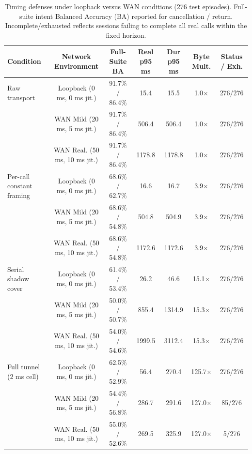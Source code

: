 \begin{table}[t]
\centering
\caption{Timing defenses under loopback versus WAN conditions (276 test episodes). Full-suite intent Balanced Accuracy (BA) reported for cancellation / return. Incomplete/exhausted reflects sessions failing to complete all real calls within the fixed horizon.}
\label{tab:wan-controls-comparison}
\footnotesize\setlength{\tabcolsep}{3pt}
\begin{tabular}{lcccccc}
\toprule
\textbf{Condition} & \textbf{Network Environment} & \textbf{Full-Suite BA} & \textbf{Real p95 ms} & \textbf{Dur p95 ms} & \textbf{Byte Mult.} & \textbf{Status / Exh.} \\
\midrule
Raw transport & Loopback (0 ms, 0 ms jit.) & 91.7\% / 86.4\% & 15.4 & 15.5 & 1.0$\times$ & 276/276 \\
& WAN Mild (20 ms, 5 ms jit.) & 91.7\% / 86.4\% & 506.4 & 506.4 & 1.0$\times$ & 276/276 \\
& WAN Real. (50 ms, 10 ms jit.) & 91.7\% / 86.4\% & 1178.8 & 1178.8 & 1.0$\times$ & 276/276 \\
\midrule
Per-call constant framing & Loopback (0 ms, 0 ms jit.) & 68.6\% / 62.7\% & 16.6 & 16.7 & 3.9$\times$ & 276/276 \\
& WAN Mild (20 ms, 5 ms jit.) & 68.6\% / 54.8\% & 504.8 & 504.9 & 3.9$\times$ & 276/276 \\
& WAN Real. (50 ms, 10 ms jit.) & 68.6\% / 54.8\% & 1172.6 & 1172.6 & 3.9$\times$ & 276/276 \\
\midrule
Serial shadow cover & Loopback (0 ms, 0 ms jit.) & 61.4\% / 53.4\% & 26.2 & 46.6 & 15.1$\times$ & 276/276 \\
& WAN Mild (20 ms, 5 ms jit.) & 50.0\% / 50.7\% & 855.4 & 1314.9 & 15.3$\times$ & 276/276 \\
& WAN Real. (50 ms, 10 ms jit.) & 54.0\% / 54.6\% & 1999.5 & 3112.4 & 15.3$\times$ & 276/276 \\
\midrule
Full tunnel (2 ms cell) & Loopback (0 ms, 0 ms jit.) & 62.5\% / 52.9\% & 56.4 & 270.4 & 125.7$\times$ & 276/276 \\
& WAN Mild (20 ms, 5 ms jit.) & 54.4\% / 56.8\% & 286.7 & 291.6 & 127.0$\times$ & 85/276 \\
& WAN Real. (50 ms, 10 ms jit.) & 55.0\% / 52.6\% & 269.5 & 325.9 & 127.0$\times$ & 5/276 \\
\bottomrule
\end{tabular}
\end{table}